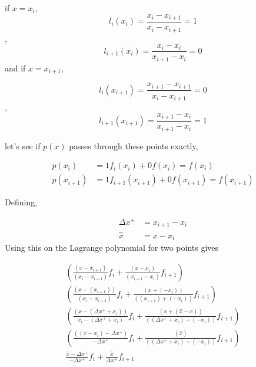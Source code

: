 \documentclass[12pt]{article}
\begin{document}
if $x = x_i$,
\[ l_i(x_i) = \frac{x_i - x_{i+1}}{x_i - x_{i+1} }= 1\], 
\[l_{i + 1}(x_i) = \frac{x_i-x_i}{x_{i+1} - x_{i}} = 0\]
and 
if $x = x_{i+1}$,

\[ l_i(x_{i+1}) = \frac{x_{i+1} - x_{i+1}}{x_i - x_{i+1} }= 0\], 
\[l_{i + 1}(x_{i+1}) = \frac{x_{i+1}-x_i}{x_{i+1} - x_{i}} = 1\]

let's see if $p\left( x \right)$ passes through these points exactly,

\begin{align*}
    p\left( x_i \right) &= 1 f_i(x_i) + 0 f\left( x_i  \right) =  f\left( x_i  \right) \\
    p\left( x_{i+1} \right) &= 1 f_{i+1}(x_{i+1}) + 0 f\left( x_{i+1}  \right) =  f\left( x_{i+1}  \right) 
\end{align*}

Defining,

\begin{align*}
    \Delta x^+ &= x_{i+1} - x_i \\
    \hat{x} &= x - x_i 
\end{align*}
Using this on the Lagrange polynomial for two points gives 

\begin{align*}
    \left( \frac{
            \left( x - x_{i+1} \right)
            }{
            \left( x_i - x_{i+1} \right)
        }
        f_i
        + \frac{
            \left( x - x_i  \right)
            }{
            \left(x_{i+1}- x_i \right)
        }
        f_{i+1}
    \right) \\
    \left( 
        \frac{
            \left( x - \left( x_{i+1} \right) \right)
            }{
            \left( x_i - x_{i+1}\right)
        } 
        f_i + 
        \frac{
            \left( x + \left( -x_i \right) \right)
            }{
            \left( \left( x_{i+1} \right) + \left( -x_i \right) \right)
        }
        f_{i+1}
    \right) \\
    \left(
        \frac{
            (x-\left( \Delta x^+ + x_i \right)) 
            }{
            x_i - (\Delta x^+ + x_i)
        }
        f_i
        +
        \frac{ 
            \left( x + \left( \hat{x} - x \right) \right)
            }{
            \left( \left( \Delta x^+ + x_i \right) + \left( -x_i \right) \right)
        }
        f_{i+1}
    \right)  \\
    \left(
        \frac{
            (\left(x-x_i  \right) -\Delta x^+)   
            }{ 
            - \Delta x^+ 
        }
        f_i
        +
        \frac{
            \left(   \hat{x}    \right)
            }{\left( \left(  \Delta x^+ + x_i \right)  + \left( -x_i \right) \right)
        } f_{i+1}
    \right) \\
    \frac{
        \hat{x} - \Delta x^+
        }{
        -\Delta x^+
    }
    f_i
    +
    \frac{
        \hat{x}
        }{
        \Delta x^+
    }
    f_{i+1}
\end{align*}
\end{document}

